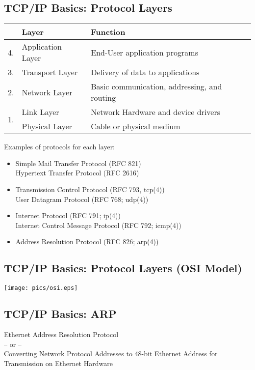 \documentclass[xga]{xdvislides}
\begin{document}
\subsection{TCP/IP Basics: Protocol Layers}
\begin{center}
	\begin{tabular}{|cl|l|}
	\hline
	& {\bf Layer} & {\bf Function} \\
	\hline
	4. & Application Layer & End-User application programs \\
	3. & Transport Layer & Delivery of data to applications \\
	2. & Network Layer & Basic communication, addressing, and routing \\
	\multirow{2}{*}{1.} & Link Layer & Network Hardware and device drivers \\
	& Physical Layer & Cable or physical medium \\
	\hline
	\end{tabular}
\end{center}
\addvspace{.5in}
Examples of protocols for each layer:
\begin{itemize}
	\item Simple Mail Transfer Protocol (RFC 821) \\
		Hypertext Transfer Protocol (RFC 2616)
	\item Transmission Control Protocol (RFC 793, tcp(4)) \\
		User Datagram Protocol (RFC 768; udp(4))
	\item Internet Protocol (RFC 791; ip(4)) \\
		Internet Control Message Protocol (RFC 792; icmp(4))
	\item Address Resolution Protocol (RFC 826; arp(4))
\end{itemize}

\subsection{TCP/IP Basics: Protocol Layers (OSI Model)}
\vspace*{\fill}
\begin{center}
	\texttt{[image: pics/osi.eps]}
\end{center}
\vspace*{\fill}

\subsection{TCP/IP Basics: ARP}
\begin{center}
Ethernet Address Resolution Protocol \\
-- or -- \\
Converting Network Protocol Addresses to 48-bit Ethernet Address for Transmission on Ethernet Hardware
\end{center}
\end{document}

